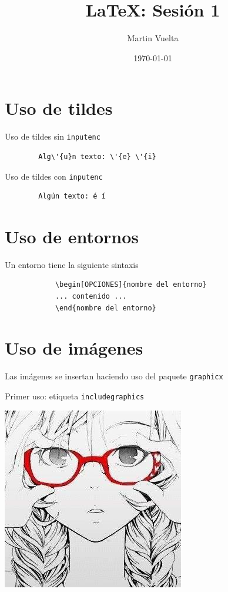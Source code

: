 \documentclass[a4paper]{article}
\begin{document}
    \title{\LaTeX: Sesión 1}
    \author{Martin Vuelta}
    \date{\today}
    \maketitle

    \section{Uso de tildes}
        Uso de tildes sin \texttt{inputenc}

        \begin{verbatim}
        Alg\'{u}n texto: \'{e} \'{i}
        \end{verbatim}

        Uso de tildes con \texttt{inputenc}

        \begin{verbatim}
        Algún texto: é í
        \end{verbatim}

    \section{Uso de entornos}\label{sec:2}

        Un entorno tiene la siguiente sintaxis

        \begin{verbatim}
            \begin[OPCIONES]{nombre del entorno}
            ... contenido ...
            \end{nombre del entorno}
        \end{verbatim}

    \section{Uso de imágenes}
        Las imágenes se insertan haciendo uso del paquete \texttt{graphicx}

        Primer uso: etiqueta \texttt{includegraphics}

        \includegraphics[scale=0.5]{imagen.jpg}
\end{document}
